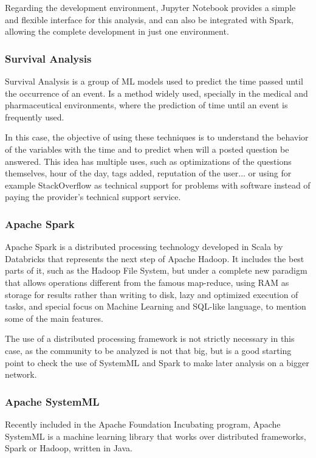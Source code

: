 \documentclass[11pt]{article} %
\begin{document}
    Regarding the development environment, Jupyter Notebook provides a simple and flexible interface for this analysis, and can also be integrated with Spark, allowing the complete development in just one environment.

  \subsubsection{Survival Analysis}

    Survival Analysis is a group of ML models used to predict the time passed until the occurrence of an event. Is a method widely used, specially in the medical and pharmaceutical environments, where the prediction of time until an event is frequently used.

    In this case, the objective of using these techniques is to understand the behavior of the variables with the time and to predict when will a posted question be answered. This idea has multiple uses, such as optimizations of the questions themselves, hour of the day, tags added, reputation of the user... or using for example StackOverflow as technical support for problems with software instead of paying the provider's technical support service.

  \subsubsection{Apache Spark}

    Apache Spark is a distributed processing technology developed in Scala by Databricks that represents the next step of Apache Hadoop. It includes the best parts of it, such as the Hadoop File System, but under a complete new paradigm that allows operations different from the famous map-reduce, using RAM as storage for results rather than writing to disk, lazy and optimized execution of tasks, and special focus on Machine Learning and SQL-like language, to mention some of the main features.

    The use of a distributed processing framework is not strictly necessary in this case, as the community to be analyzed is not that big, but is a good starting point to check the use of SystemML and Spark to make later analysis on a bigger network.

  \subsubsection{Apache SystemML}

    Recently included in the Apache Foundation Incubating  program, Apache SystemML is a machine learning library that works over distributed frameworks, Spark or Hadoop, written in Java.
\end{document}
